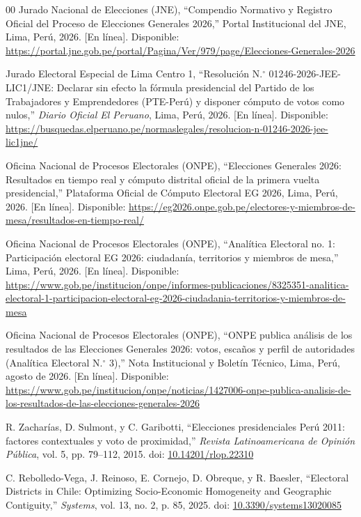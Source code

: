 \documentclass[conference,10pt,letterpaper]{IEEEtran}
\begin{document}
\begin{thebibliography}{00}
 Jurado Nacional de Elecciones (JNE), ``Compendio Normativo y Registro Oficial del Proceso de Elecciones Generales 2026,'' Portal Institucional del JNE, Lima, Perú, 2026. [En línea]. Disponible: \url{https://portal.jne.gob.pe/portal/Pagina/Ver/979/page/Elecciones-Generales-2026}

 Jurado Electoral Especial de Lima Centro 1, ``Resolución N.$^\circ$ 01246-2026-JEE-LIC1/JNE: Declarar sin efecto la fórmula presidencial del Partido de los Trabajadores y Emprendedores (PTE-Perú) y disponer cómputo de votos como nulos,'' \textit{Diario Oficial El Peruano}, Lima, Perú, 2026. [En línea]. Disponible: \url{https://busquedas.elperuano.pe/normaslegales/resolucion-n-01246-2026-jee-lic1jne/}

 Oficina Nacional de Procesos Electorales (ONPE), ``Elecciones Generales 2026: Resultados en tiempo real y cómputo distrital oficial de la primera vuelta presidencial,'' Plataforma Oficial de Cómputo Electoral EG 2026, Lima, Perú, 2026. [En línea]. Disponible: \url{https://eg2026.onpe.gob.pe/electores-y-miembros-de-mesa/resultados-en-tiempo-real/}

 Oficina Nacional de Procesos Electorales (ONPE), ``Analítica Electoral no. 1: Participación electoral EG 2026: ciudadanía, territorios y miembros de mesa,'' Lima, Perú, 2026. [En línea]. Disponible: \url{https://www.gob.pe/institucion/onpe/informes-publicaciones/8325351-analitica-electoral-1-participacion-electoral-eg-2026-ciudadania-territorios-y-miembros-de-mesa}

 Oficina Nacional de Procesos Electorales (ONPE), ``ONPE publica análisis de los resultados de las Elecciones Generales 2026: votos, escaños y perfil de autoridades (Analítica Electoral N.$^\circ$ 3),'' Nota Institucional y Boletín Técnico, Lima, Perú, agosto de 2026. [En línea]. Disponible: \url{https://www.gob.pe/institucion/onpe/noticias/1427006-onpe-publica-analisis-de-los-resultados-de-las-elecciones-generales-2026}

 R. Zacharías, D. Sulmont, y C. Garibotti, ``Elecciones presidenciales Perú 2011: factores contextuales y voto de proximidad,'' \textit{Revista Latinoamericana de Opinión Pública}, vol. 5, pp. 79--112, 2015. doi: \href{https://doi.org/10.14201/rlop.22310}{10.14201/rlop.22310}

 C. Rebolledo-Vega, J. Reinoso, E. Cornejo, D. Obreque, y R. Baesler, ``Electoral Districts in Chile: Optimizing Socio-Economic Homogeneity and Geographic Contiguity,'' \textit{Systems}, vol. 13, no. 2, p. 85, 2025. doi: \href{https://doi.org/10.3390/systems13020085}{10.3390/systems13020085}


\end{thebibliography}
\end{document}
